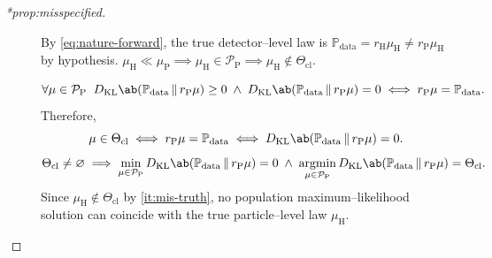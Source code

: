 \documentclass[12pt]{article}
\newcommand{\Herwig}{\mathrm{H}}
\newcommand{\Pythia}{\mathrm{P}}
\newcommand{\Prb}{\mathbb{P}}
\newcommand{\KL}{D_{\mathrm{KL}}}
\newcommand{\Meas}{\mathcal{P}}
\newcommand{\1}{\mathbbm{1}}
\renewcommand{\[}{\begin{equation}}
\renewcommand{\]}{\end{equation}}
\begin{document}
\begin{proof}[*prop:misspecified]
        \begin{description}
            \item[] By \cref{eq:nature-forward}, the true detector--level law is \(\Prb_{\mathrm{data}} = r_\Herwig\mu_\Herwig \ne r_\Pythia\mu_\Herwig\) by hypothesis.
                \(\mu_\Herwig \ll \mu_\Pythia \implies \mu_\Herwig \in \Meas_\Pythia \implies \mu_\Herwig \notin \Theta_{\mathrm{cl}}\).
                
            \item[]
                \[
                    \forall \mu \in \Meas_\Pythia \;\; \KL \ab( \Prb_{\mathrm{data}} \,\|\, r_\Pythia\mu ) \ge 0\; \land\; \KL \ab( \Prb_{\mathrm{data}} \,\|\, r_\Pythia\mu ) = 0 \iff r_\Pythia\mu = \Prb_{\mathrm{data}}.\]
                Therefore,
                \[
                    \mu \in \Theta_{\mathrm{cl}} \iff r_\Pythia\mu = \Prb_{\mathrm{data}} \iff \KL\ab(\Prb_{\mathrm{data}} \,\|\, r_\Pythia\mu) = 0.
                \]
                \[ \Theta_{\mathrm{cl}} \ne \varnothing \implies \min_{\mu \in \Meas_\Pythia} \KL\ab(\Prb_{\mathrm{data}} \,\|\, r_\Pythia\mu) = 0 \;\land \;
                    \operatorname*{argmin}_{\mu \in \Meas_\Pythia} \KL \ab( \Prb_{\mathrm{data}} \,\|\, r_\Pythia\mu ) = \Theta_{\mathrm{cl}}.
                \]
                Since \(\mu_\Herwig \notin \Theta_{\mathrm{cl}}\) by \cref{it:mis-truth}, no population maximum--likelihood solution can coincide with the true particle--level law \(\mu_\Herwig\).
        \end{description}
    \end{proof}
\end{document}
